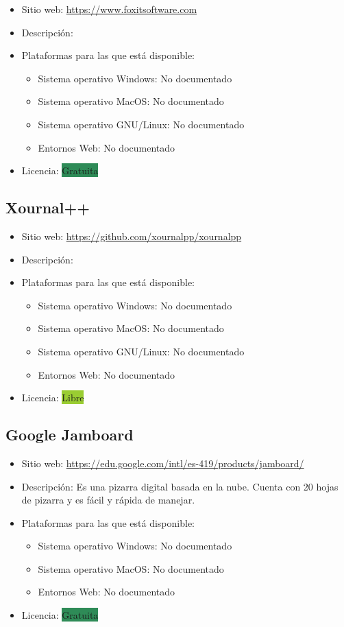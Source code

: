 \documentclass[11pt]{article}
\newcommand{\nodoc}{No documentado}
\newcommand{\libre}{\colorbox{YellowGreen}{Libre}}
\newcommand{\gratis}{\colorbox{SeaGreen}{Gratuita}}
\begin{document}
\begin{itemize}
\item Sitio web: \url{https://www.foxitsoftware.com}
\item Descripción:
\item Plataformas para las que está disponible:
  \begin{itemize}
  \item Sistema operativo Windows: \nodoc
  \item Sistema operativo MacOS: \nodoc
  \item Sistema operativo GNU/Linux: \nodoc
  \item Entornos Web: \nodoc
  \end{itemize}
\item Licencia: \gratis
\end{itemize}


\subsection{Xournal++}

\begin{itemize}
\item Sitio web: \url{https://github.com/xournalpp/xournalpp}
\item Descripción:
\item Plataformas para las que está disponible:
  \begin{itemize}
  \item Sistema operativo Windows: \nodoc
  \item Sistema operativo MacOS: \nodoc
  \item Sistema operativo GNU/Linux: \nodoc
  \item Entornos Web: \nodoc
  \end{itemize}
\item Licencia: \libre
\end{itemize}


\subsection{Google Jamboard}

\begin{itemize}
\item Sitio web: \url{https://edu.google.com/intl/es-419/products/jamboard/}
\item Descripción: Es una pizarra digital basada en la nube. Cuenta con 20 hojas de pizarra y es fácil y rápida de manejar.
\item Plataformas para las que está disponible:
  \begin{itemize}
  \item Sistema operativo Windows: \nodoc
  \item Sistema operativo MacOS: \nodoc
  \item Entornos Web: \nodoc
  \end{itemize}
\item Licencia: \gratis
\end{itemize}
\end{document}
